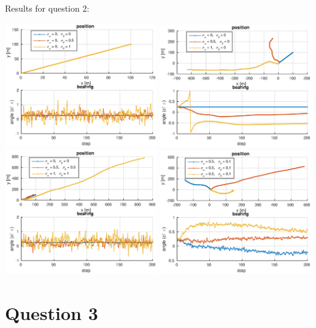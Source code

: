 \documentclass[english,DIV=13]{scrartcl}
\begin{document}
Results for question 2:
\begin{center}
   \includegraphics[width=0.49\textwidth]{img/q2_1.eps}
   \includegraphics[width=0.49\textwidth]{img/q2_2.eps}
   \includegraphics[width=0.49\textwidth]{img/q2_3.eps}
   \includegraphics[width=0.49\textwidth]{img/q2_4.eps}
\end{center}


\section*{Question 3}
\end{document}
